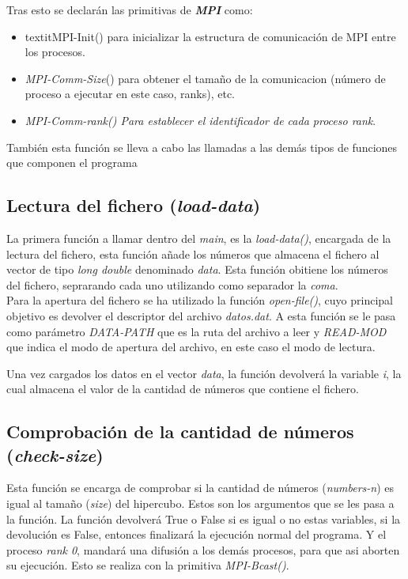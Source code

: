 \documentclass[11pt]{article}
\begin{document}
Tras esto se declarán las primitivas de \textit{\textbf{MPI}} como: 
\begin{itemize}
	\item textit{MPI-Init}() para inicializar la estructura de comunicación de MPI entre los procesos. 
	\item \textit{MPI-Comm-Size}() para obtener el tamaño de la comunicacion (número de proceso a ejecutar en este caso, ranks), etc.
	\item \textit{MPI-Comm-rank() Para establecer el identificador de cada proceso \textit{rank}}.
\end{itemize}

También esta función se lleva a cabo las llamadas a las demás tipos de funciones que componen el programa



\subsection{Lectura del fichero (\textit{load-data})}
La primera función a llamar dentro del \textit{main}, es la \textit{load-data()}, encargada de la lectura del fichero, esta función añade los números que almacena el fichero al vector de tipo \textit{long double} denominado \textit{data}.
Esta función obitiene los números del fichero, seprarando cada uno utilizando como separador la \textit{coma}.\\

Para la apertura del fichero se ha utilizado la función \textit{open-file()}, cuyo principal objetivo es devolver el descriptor del archivo \textit{datos.dat}.
A esta función se le pasa como parámetro \textit{DATA-PATH} que es la ruta del archivo a leer y \textit{READ-MOD} que indica el modo de apertura del archivo, en este caso el modo de lectura.


Una vez cargados los datos en el vector \textit{data}, la función devolverá la variable \textit{i}, la cual almacena el valor de la cantidad de números que contiene el fichero.


\subsection{Comprobación de la cantidad de números (\textit{check-size})}
Esta función se encarga de comprobar si la cantidad de números (\textit{numbers-n}) es igual al tamaño (\textit{size}) del hipercubo. Estos son los argumentos que se les pasa a la función.
La función devolverá True o False si es igual o no estas variables, si la devolución es False, entonces finalizará la ejecución normal del programa. Y el proceso \textit{rank 0}, mandará una difusión a los demás procesos, para que asi aborten su ejecución. Esto se realiza con la primitiva \textit{MPI-Bcast()}. 
\end{document}
